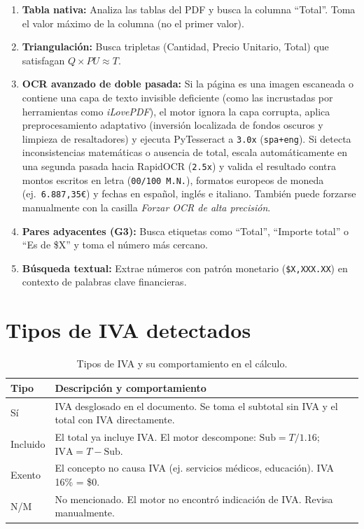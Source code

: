 \documentclass[12pt, a4paper, oneside]{report}
\begin{document}
\begin{enumerate}
  \item \textbf{Tabla nativa:} Analiza las tablas del PDF y busca la columna
        ``Total''. Toma el valor máximo de la columna (no el primer valor).
  \item \textbf{Triangulación:} Busca tripletas (Cantidad, Precio Unitario, Total)
        que satisfagan $Q \times PU \approx T$.
  \item \textbf{OCR avanzado de doble pasada:} Si la página es una imagen escaneada o
        contiene una capa de texto invisible deficiente (como las incrustadas por
        herramientas como \textit{iLovePDF}), el motor ignora la capa corrupta,
        aplica preprocesamiento adaptativo (inversión localizada de fondos oscuros y
        limpieza de resaltadores) y ejecuta PyTesseract a \texttt{3.0x}
        (\texttt{spa+eng}). Si detecta inconsistencias matemáticas o ausencia de total,
        escala automáticamente en una segunda pasada hacia RapidOCR (\texttt{2.5x}) y
        valida el resultado contra montos escritos en letra (\texttt{00/100 M.N.}),
        formatos europeos de moneda (ej.\ \texttt{6.887,35€}) y fechas en español,
        inglés e italiano. También puede forzarse manualmente con la casilla
        \textit{Forzar OCR de alta precisión}.
  \item \textbf{Pares adyacentes (G3):} Busca etiquetas como ``Total'',
        ``Importe total'' o ``Es de \$X'' y toma el número más cercano.
  \item \textbf{Búsqueda textual:} Extrae números con patrón monetario
        (\texttt{\$X,XXX.XX}) en contexto de palabras clave financieras.
\end{enumerate}

\section{Tipos de IVA detectados}

\begin{table}[H]
  \centering
  \begin{tabularx}{\linewidth}{lX}
    \toprule
    \textbf{Tipo} & \textbf{Descripción y comportamiento} \\
    \midrule
    Sí        & IVA desglosado en el documento. Se toma el subtotal sin IVA y el total con IVA directamente. \\
    Incluido  & El total ya incluye IVA. El motor descompone: $\text{Sub} = T / 1.16$;
                $\text{IVA} = T - \text{Sub}$. \\
    Exento    & El concepto no causa IVA (ej. servicios médicos, educación).
                IVA 16\% = \$0. \\
    N/M       & No mencionado. El motor no encontró indicación de IVA. Revisa manualmente. \\
    \bottomrule
  \end{tabularx}
  \caption{Tipos de IVA y su comportamiento en el cálculo.}
\end{table}
\end{document}
